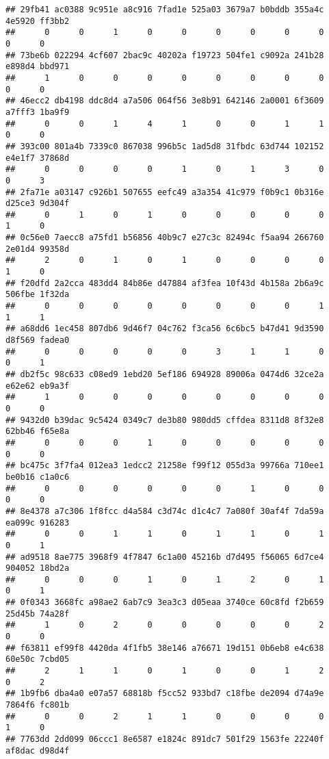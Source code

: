 \documentclass[
]{article}
\begin{document}
\begin{verbatim}
## 29fb41 ac0388 9c951e a8c916 7fad1e 525a03 3679a7 b0bddb 355a4c 4e5920 ff3bb2 
##      0      0      1      0      0      0      0      0      0      0      0 
## 73be6b 022294 4cf607 2bac9c 40202a f19723 504fe1 c9092a 241b28 e898d4 bbd971 
##      1      0      0      0      0      0      0      0      0      0      0 
## 46ecc2 db4198 ddc8d4 a7a506 064f56 3e8b91 642146 2a0001 6f3609 a7fff3 1ba9f9 
##      0      0      1      4      1      0      0      1      1      0      0 
## 393c00 801a4b 7339c0 867038 996b5c 1ad5d8 31fbdc 63d744 102152 e4e1f7 37868d 
##      0      0      0      0      1      0      1      3      0      0      3 
## 2fa71e a03147 c926b1 507655 eefc49 a3a354 41c979 f0b9c1 0b316e d25ce3 9d304f 
##      0      1      0      1      0      0      0      0      0      1      0 
## 0c56e0 7aecc8 a75fd1 b56856 40b9c7 e27c3c 82494c f5aa94 266760 2e01d4 99358d 
##      2      0      1      0      1      0      0      0      0      1      0 
## f20dfd 2a2cca 483dd4 84b86e d47884 af3fea 10f43d 4b158a 2b6a9c 506fbe 1f32da 
##      0      0      0      0      0      0      0      0      1      1      1 
## a68dd6 1ec458 807db6 9d46f7 04c762 f3ca56 6c6bc5 b47d41 9d3590 d8f569 fadea0 
##      0      0      0      0      0      3      1      1      0      0      1 
## db2f5c 98c633 c08ed9 1ebd20 5ef186 694928 89006a 0474d6 32ce2a e62e62 eb9a3f 
##      1      0      0      0      0      0      0      0      0      0      0 
## 9432d0 b39dac 9c5424 0349c7 de3b80 980dd5 cffdea 8311d8 8f32e8 62bb46 f65e8a 
##      0      0      0      1      0      0      0      0      0      0      0 
## bc475c 3f7fa4 012ea3 1edcc2 21258e f99f12 055d3a 99766a 710ee1 be0b16 c1a0c6 
##      0      0      0      0      0      0      1      0      0      0      0 
## 8e4378 a7c306 1f8fcc d4a584 c3d74c d1c4c7 7a080f 30af4f 7da59a ea099c 916283 
##      0      0      1      1      0      1      1      0      1      0      1 
## ad9518 8ae775 3968f9 4f7847 6c1a00 45216b d7d495 f56065 6d7ce4 904052 18bd2a 
##      0      0      0      1      0      1      2      0      1      0      1 
## 0f0343 3668fc a98ae2 6ab7c9 3ea3c3 d05eaa 3740ce 60c8fd f2b659 25d45b 74a28f 
##      1      0      2      0      0      0      0      0      2      0      0 
## f63811 ef99f8 4420da 4f1fb5 38e146 a76671 19d151 0b6eb8 e4c638 60e50c 7cbd05 
##      2      1      1      0      1      0      0      1      2      0      2 
## 1b9fb6 dba4a0 e07a57 68818b f5cc52 933bd7 c18fbe de2094 d74a9e 7864f6 fc801b 
##      0      0      2      1      1      0      0      0      0      1      0 
## 7763dd 2dd099 06ccc1 8e6587 e1824c 891dc7 501f29 1563fe 22240f af8dac d98d4f 

\end{verbatim}
\end{document}
